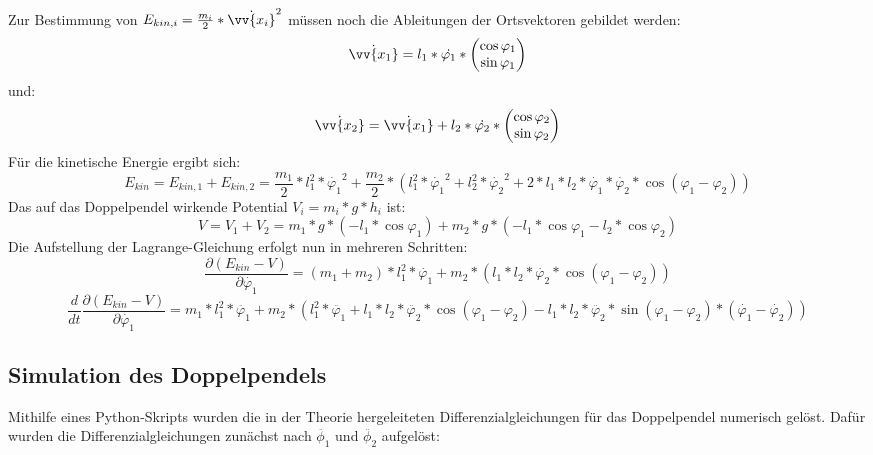 Zur Bestimmung von $E_{kin,i} = \frac{m_i}{2} * \dot{\vv{x_i}}^2$  müssen noch die Ableitungen der Ortsvektoren gebildet werden:
\begin{equation}
\dot{\vv{x_1}} = l_1*\dot{\varphi_1}*\begin{pmatrix}
\cos \varphi_1 \\ \sin \varphi_1
\end{pmatrix}
\end{equation}
und:
\begin{equation}
\dot{\vv{x_2}} = \dot{\vv{x_1}} + l_2 * \dot{\varphi_2} * \begin{pmatrix}
\cos \varphi_2 \\ \sin \varphi_2
\end{pmatrix} 
\end{equation}
Für die kinetische Energie ergibt sich:
\begin{equation}
E_{kin} = E_{kin,1} + E_{kin,2} = \frac{m_1}{2} * l_1^2 * \dot{\varphi_1}^2 +
\frac{m_2}{2} * (l_1^2 * \dot{\varphi_1}^2 + l_2^2 * \dot{\varphi_2}^2 + 2 * l_1 * l_2 * \dot{\varphi_1} * \dot{\varphi_2} * \cos (\varphi_1 - \varphi_2))
\end{equation}
Das auf das Doppelpendel wirkende Potential $ V_i = m_i * g * h_i $ ist:
\begin{equation}
V = V_1 + V_2 = m_1 * g * (-l_1 * \cos \varphi_1) + m_2 * g * (-l_1 * \cos \varphi_1 - l_2 * \cos \varphi_2)
\end{equation}
Die Aufstellung der Lagrange-Gleichung erfolgt nun in mehreren Schritten:
\begin{equation}
\frac{\partial (E_{kin} - V)}{\partial\dot{\varphi_1}} = (m_1 + m_2) * l_1^2 *\dot{\varphi_1} + m_2 * (l_1 * l_2 * \dot{\varphi_2} * \cos (\varphi_1 - \varphi_2)) 
\end{equation}
\begin{equation}
\frac{d}{dt} \frac{\partial (E_{kin} - V)}{\partial\dot{\varphi_1}} = m_1 *l_1^2 * \ddot{\varphi_1} + m_2 * (l_1^2 * \ddot{\varphi_1} + l_1 * l_2 * \ddot{\varphi_2} * \cos (\varphi_1 - \varphi_2) - l_1 * l_2 * \ddot{\varphi_2} * \sin (\varphi_1 - \varphi_2) *(\dot{\varphi_1} - \dot{\varphi_2}) )
\end{equation}


\subsection{Simulation des Doppelpendels}
Mithilfe eines Python-Skripts wurden die in der Theorie hergeleiteten Differenzialgleichungen für das Doppelpendel numerisch gelöst. Dafür wurden die Differenzialgleichungen zunächst nach $ \ddot{\phi_1} $ und $\ddot{\phi_2} $ aufgelöst: 

